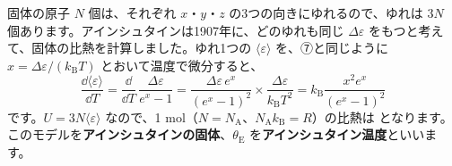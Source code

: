 固体の原子 $N$ 個は、それぞれ $x$・$y$・$z$ の3つの向きにゆれるので、ゆれは $3N$ 個あります。アインシュタインは1907年に、どのゆれも同じ $\Delta\varepsilon$ をもつと考えて、固体の比熱を計算しました。ゆれ1つの $\langle\varepsilon\rangle$ を、⑦と同じように $x=\Delta\varepsilon/(k_{\mathrm B}T)$ とおいて温度で微分すると、
\[\frac{\dd\langle\varepsilon\rangle}{\dd T}=\frac{\dd}{\dd T}\,\frac{\Delta\varepsilon}{e^x-1}=\frac{\Delta\varepsilon\,e^x}{(e^x-1)^2}\times\frac{\Delta\varepsilon}{k_{\mathrm B}T^2}=k_{\mathrm B}\frac{x^2e^x}{(e^x-1)^2}\]
です。$U=3N\langle\varepsilon\rangle$ なので、1 mol（$N=N_{\mathrm A}$、$N_{\mathrm A}k_{\mathrm B}=R$）の比熱は
\label{ph:熱-15:einstein}となります。このモデルを\textbf{アインシュタインの固体}、$\theta_{\mathrm E}$ を\textbf{アインシュタイン温度}といいます。

\begin{phflow}[ゆれる原子の分配関数から]
\end{phflow}

